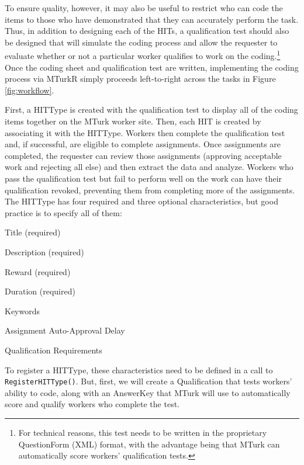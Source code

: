 \documentclass[11pt]{article}
\begin{document}
To ensure quality, however, it may also be useful to restrict who can code the items to those who have demonstrated that they can accurately perform the task. Thus, in addition to designing each of the HITs, a qualification test should also be designed that will simulate the coding process and allow the requester to evaluate whether or not a particular worker qualifies to work on the coding.\footnote{For technical reasons, this test needs to be written in the proprietary QuestionForm (XML) format, with the advantage being that MTurk can automatically score workers' qualification tests.} Once the coding sheet and qualification test are written, implementing the coding process via MTurkR simply proceeds left-to-right across the tasks in Figure \ref{fig:workflow}.

First, a HITType is created with the qualification test to display all of the coding items together on the MTurk worker site. Then, each HIT is created by associating it with the HITType. Workers then complete the qualification test and, if successful, are eligible to complete assignments. Once assignments are completed, the requester can review those assignments (approving acceptable work and rejecting all else) and then extract the data and analyze. Workers who pass the qualification test but fail to perform well on the work can have their qualification revoked, preventing them from completing more of the assignments. The HITType has four required and three optional characteristics, but good practice is to specify all of them:
\singlespacing\begin{itemize*}
\item Title (required)
\item Description (required)
\item Reward (required)
\item Duration (required)
\item Keywords
\item Assignment Auto-Approval Delay
\item Qualification Requirements
\end{itemize*}

\noindent To register a HITType, these characteristics need to be defined in a call to \verb|RegisterHITType()|. But, first, we will create a Qualification that tests workers' ability to code, along with an AnswerKey that MTurk will use to automatically score and qualify workers who complete the test.

\end{document}
